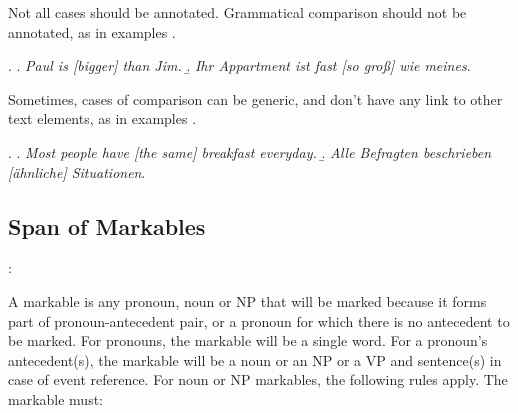 \documentclass[a4paper]{article}
\begin{document}
Not all cases should be annotated. %
Grammatical comparison should not be annotated, as in examples \Next[a-b].

\ex.
\a. {\sl Paul is [bigger] than Jim.}
\b. {\sl Ihr Appartment ist fast [so groß] wie meines.}

Sometimes, cases of comparison can be generic, and don't have any link to other text elements, as in examples \Next[a-b].

\ex.
\a. {\sl Most people have [the same] breakfast everyday.}
\b. {\sl Alle Befragten beschrieben [ähnliche] Situationen}.


\subsection{Span of Markables}

\cite{GrishinaStedeGuide,GuillouEtAlGuide}:

A markable is any pronoun, noun or NP that will be marked because it forms part of pronoun-antecedent pair, or a pronoun for which there is no antecedent to be marked. For pronouns, the markable will be a single word. For a pronoun's antecedent(s), the markable will be a noun or an NP or a VP and sentence(s) in case of event reference. For noun or NP markables, the following rules apply. The markable must:
\end{document}

